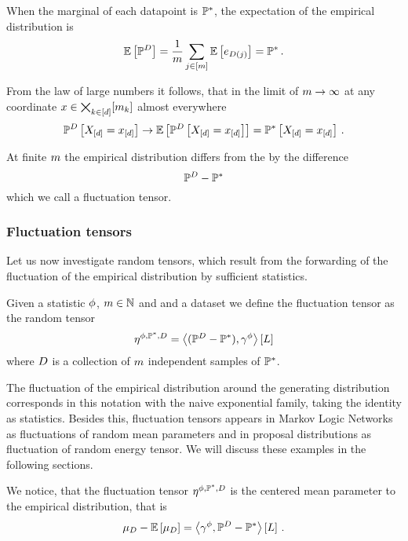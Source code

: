When the marginal of each datapoint is $\mathbb{P}^*$, the expectation of the empirical distribution is
\begin{align*}
	\mathbb{E}\left[\mathbb{P}^{D}\right] 
	= \frac{1}{m} \sum_{j\in[m]}  \mathbb{E}\left[e_{D(j)}\right]
	= \mathbb{P}^* \, . 
\end{align*}

From the law of large numbers it follows, that in the limit of $m\rightarrow\infty$ at any coordinate $x\in\bigtimes_{k\in[d]}[m_{k}]$ almost everywhere
	\[ \mathbb{P}^{D}\left[X_{[d]}=x_{[d]}\right] \rightarrow \mathbb{E}\left[\mathbb{P}^{D}\left[X_{[d]}=x_{[d]}\right]\right] =  \mathbb{P}^*\left[X_{[d]}=x_{[d]}\right] \, . \]

At finite $m$ the empirical distribution differs from the by the difference
	\[ \mathbb{P}^{D} - \mathbb{P}^* \]
which we call a fluctuation tensor.


\subsubsection{Fluctuation tensors}

Let us now investigate random tensors, which result from the forwarding of the fluctuation of the empirical distribution by sufficient statistics.

\begin{definition}
	Given a statistic $\phi$, $m\in\mathbb{N}$ and and a dataset we define the fluctuation tensor as the random tensor
		\[ \eta^{\phi,\mathbb{P}^*,D} = \left\langle (\mathbb{P}^{D}-\mathbb{P}^*),\gamma^{\phi}\right\rangle \left[ L \right] \]
	where $D$ is a collection of $m$ independent samples of $\mathbb{P}^*$.
\end{definition}

The fluctuation of the empirical distribution around the generating distribution corresponds in this notation with the naive exponential family, taking the identity as statistics.
Besides this, fluctuation tensors appears in Markov Logic Networks as fluctuations of random mean parameters and in proposal distributions as fluctuation of random energy tensor.
We will discuss these examples in the following sections.


We notice, that the fluctuation tensor $\eta^{\phi,\mathbb{P}^*,D}$ is the centered mean parameter to the empirical distribution, that is
\begin{align*}
	\mu_{D} - \mathbb{E}\left[\mu_{D}\right] =  \left\langle \gamma^{\phi},\mathbb{P}^{D}-\mathbb{P}^*\right\rangle \left[ L \right] \, . 
\end{align*}


